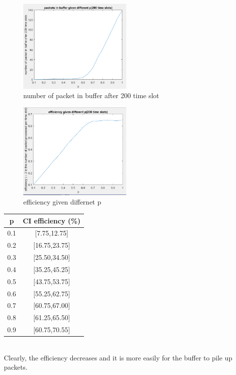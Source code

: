 \documentclass[twoside]{article}
\begin{document}
\begin{multicols*}{2}
\begin{lstlisting}
\end{lstlisting}
\begin{figure}[H]
   \centering
   \includegraphics[width = 0.5\textwidth]{./data/numPacket-p2.png}  
   \caption{number of packet in buffer after 200 time slot}
\end{figure}
\begin{figure}[H]
   \centering
   \includegraphics[width = 0.5\textwidth]{./data/efficiency2.png}  
   \caption{efficiency given differnet p}
\end{figure}
\begin{tabular}{|| c | c ||}
 \hline \hline
 p & CI efficiency (\%) \\ \hline \hline
0.1 & [7.75,12.75]\\ \hline
0.2 & [16.75,23.75]\\ \hline
0.3 & [25.50,34.50]\\ \hline
0.4 & [35.25,45.25]\\ \hline
0.5 & [43.75,53.75]\\ \hline
0.6 & [55.25,62.75]\\ \hline
0.7 & [60.75,67.00]\\ \hline
0.8 & [61.25,65.50]\\ \hline
0.9 & [60.75,70.55]\\ \hline 
\end{tabular}
\\Clearly, the efficiency decreases and it is more easily for the buffer to pile up packets.\\

\end{multicols*}
\end{document}
